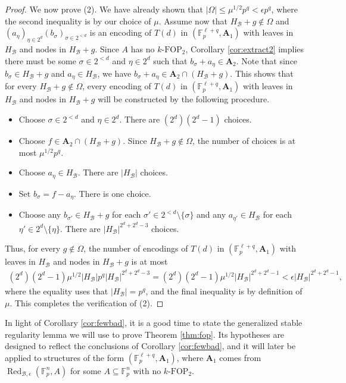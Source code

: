 \documentclass[12pt,oneside,british,a4wide]{amsart}
\numberwithin{equation}{section}
\theoremstyle{definition}
\def\F{\mathbb{F}}
\def\FOP{\mathrm{FOP}}
\def\e{\epsilon}
\newcommand{\calB}{\mathcal{B}}
\newcommand{\Red}{{\mathrm{Red}}}
\def\Red{\operatorname{Red}}
\begin{document}
\begin{proof}
We now prove (2).  We have already shown that $|\Omega|\leq \mu^{1/2}p^q<\e p^q$, where the second inequality is by our choice of $\mu$.   Assume now that $H_{\calB}+g\notin \Omega$ and $(a_{\eta})_{\eta\in 2^d}(b_{\sigma})_{\sigma\in 2^{<d}}$ is an encoding of $T(d)$ in $(\F_p^{\ell+q}, \mathbf{A}_1)$  with leaves in $H_{\calB}$ and nodes in $H_{\calB}+g$.  Since $A$ has no $k$-$\FOP_2$, Corollary \ref{cor:extract2} implies there must be some $\sigma\in 2^{<d}$ and $\eta\in 2^d$ such that $b_{\sigma}+a_{\eta}\in \mathbf{A}_2$.  Note that since $b_{\sigma}\in H_{\calB}+g$ and $a_{\eta}\in H_{\calB}$, we have $b_{\sigma}+a_{\eta}\in \mathbf{A}_2 \cap (H_{\calB}+g)$.  This shows that for every $H_{\calB}+g\notin \Omega$, every encoding of $T(d)$ in $(\F_p^{\ell+q},\mathbf{A}_1)$ with leaves in $H_{\calB}$ and nodes in $H_{\calB}+g$ will be constructed by the following procedure.
\begin{itemize}
\item Choose $\sigma\in 2^{<d}$ and $\eta\in 2^d$.  There are $(2^d)(2^d-1)$ choices.
\item Choose $f\in \mathbf{A}_2\cap (H_{\calB}+g)$.  Since $H_{\calB}+g\notin \Omega$, the number of choices is at most $\mu^{1/2} p^{q}$. 
\item Choose $a_{\eta}\in H_{\calB}$.  There are $|H_{\calB}|$ choices.
\item Set $b_{\sigma}=f-a_{\eta}$.  There is one choice.
\item Choose any $b_{\sigma'}\in H_{\calB}+g$ for each $\sigma'\in 2^{<d}\setminus \{\sigma\}$ and any $a_{\eta'}\in H_{\calB}$ for each $\eta'\in 2^d\setminus\{\eta\}$.  There are $|H_{\calB}|^{2^d+2^d-3}$ choices.
\end{itemize}

Thus, for every $g\notin \Omega$, the number of encodings of $T(d)$ in $(\F_p^{\ell+q},\mathbf{A}_1)$ with leaves in $H_{\calB}$ and nodes in $H_{\calB}+g$ is at most
\begin{align*}
(2^d)(2^d-1)\mu^{1/2} |H_{\calB}|p^{q}|H_{\calB}|^{2^d+2^d-3}=(2^d)(2^d-1)\mu^{1/2} |H_{\calB}|^{2^d+2^d-1}<\e |H_{\calB}|^{2^d+2^d-1},
\end{align*}
where the equality uses that $|H_{\calB}|=p^q$, and the final inequality is by definition of $\mu$.  This completes the verification of (2). 
\end{proof}


In light of Corollary \ref{cor:fewbad}, it is a good time to state the generalized stable regularity lemma we will use to prove Theorem \ref{thm:fop}.  Its hypotheses are designed to reflect the conclusions of Corollary \ref{cor:fewbad}, and it will later be applied to structures of the form $(\F_p^{\ell+q},\mathbf{A}_1)$, where $\mathbf{A}_1$ comes from $\Red_{\calB,\e}(\F_p^n,A)$ for some $A\subseteq \F_p^n$ with no $k$-$\FOP_2$.
\end{document}
